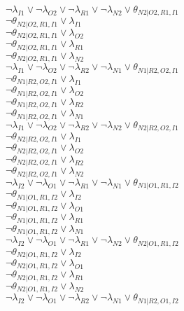 $\neg\lambda_{I1} \vee \neg\lambda_{O2} \vee \neg\lambda_{R1} \vee \neg\lambda_{N2} \vee \theta_{N2|O2,R1,I1}$\\
$\neg\theta_{N2|O2,R1,I1} \vee \lambda_{I1}$\\
$\neg\theta_{N2|O2,R1,I1} \vee \lambda_{O2}$\\
$\neg\theta_{N2|O2,R1,I1} \vee \lambda_{R1}$\\
$\neg\theta_{N2|O2,R1,I1} \vee \lambda_{N2}$\\
$\neg\lambda_{I1} \vee \neg\lambda_{O2} \vee \neg\lambda_{R2} \vee \neg\lambda_{N1} \vee \theta_{N1|R2,O2,I1}$\\
$\neg\theta_{N1|R2,O2,I1} \vee \lambda_{I1}$\\
$\neg\theta_{N1|R2,O2,I1} \vee \lambda_{O2}$\\
$\neg\theta_{N1|R2,O2,I1} \vee \lambda_{R2}$\\
$\neg\theta_{N1|R2,O2,I1} \vee \lambda_{N1}$\\
$\neg\lambda_{I1} \vee \neg\lambda_{O2} \vee \neg\lambda_{R2} \vee \neg\lambda_{N2} \vee \theta_{N2|R2,O2,I1}$\\
$\neg\theta_{N2|R2,O2,I1} \vee \lambda_{I1}$\\
$\neg\theta_{N2|R2,O2,I1} \vee \lambda_{O2}$\\
$\neg\theta_{N2|R2,O2,I1} \vee \lambda_{R2}$\\
$\neg\theta_{N2|R2,O2,I1} \vee \lambda_{N2}$\\
$\neg\lambda_{I2} \vee \neg\lambda_{O1} \vee \neg\lambda_{R1} \vee \neg\lambda_{N1} \vee \theta_{N1|O1,R1,I2}$\\
$\neg\theta_{N1|O1,R1,I2} \vee \lambda_{I2}$\\
$\neg\theta_{N1|O1,R1,I2} \vee \lambda_{O1}$\\
$\neg\theta_{N1|O1,R1,I2} \vee \lambda_{R1}$\\
$\neg\theta_{N1|O1,R1,I2} \vee \lambda_{N1}$\\
$\neg\lambda_{I2} \vee \neg\lambda_{O1} \vee \neg\lambda_{R1} \vee \neg\lambda_{N2} \vee \theta_{N2|O1,R1,I2}$\\
$\neg\theta_{N2|O1,R1,I2} \vee \lambda_{I2}$\\
$\neg\theta_{N2|O1,R1,I2} \vee \lambda_{O1}$\\
$\neg\theta_{N2|O1,R1,I2} \vee \lambda_{R1}$\\
$\neg\theta_{N2|O1,R1,I2} \vee \lambda_{N2}$\\
$\neg\lambda_{I2} \vee \neg\lambda_{O1} \vee \neg\lambda_{R2} \vee \neg\lambda_{N1} \vee \theta_{N1|R2,O1,I2}$\\
